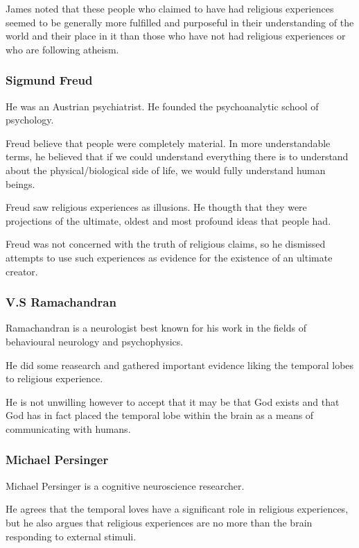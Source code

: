 \documentclass{article}
\begin{document}
James noted that these people who claimed to have had religious experiences seemed to be generally more fulfilled and purposeful in their understanding of the world and their place in it than those who have not had religious experiences or who are following atheism.

\subsubsection*{Sigmund Freud}

He was an Austrian psychiatrist.  He founded the psychoanalytic school of psychology.

Freud believe that people were completely material.  In more understandable terms, he believed that if we could understand everything there is to understand about the physical\slash biological side of life, we would fully understand human beings.

Freud saw religious experiences as illusions.  He thougth that they were projections of the ultimate, oldest and most profound ideas that people had.

Freud was not concerned with the truth of religious claims, so he dismissed attempts to use such experiences as evidence for the existence of an ultimate creator.

\subsubsection*{V.S Ramachandran}

Ramachandran is a neurologist best known for his work in the fields of behavioural neurology and psychophysics.

He did some reasearch and gathered important evidence liking the temporal lobes to religious experience.

He is not unwilling however to accept that it may be that God exists and that God has in fact placed the temporal lobe within the brain as a means of communicating with humans.

\subsubsection*{Michael Persinger}

Michael Persinger is a cognitive neuroscience researcher.

He agrees that the temporal loves have a significant role in religious experiences, but he also argues that religious experiences are no more than the brain responding to external stimuli.
\end{document}
